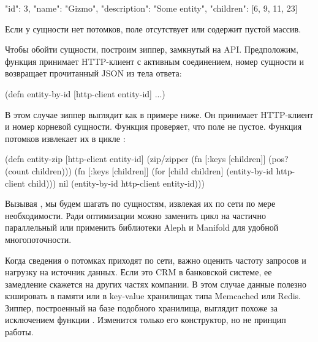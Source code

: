 \begin{english}
  \begin{json}
{
  "id": 3,
  "name": "Gizmo",
  "description": "Some entity",
  "children": [6, 9, 11, 23]
}
  \end{json}
\end{english}

Если у сущности нет потомков, поле  отсутствует или содержит
пустой массив.

Чтобы обойти сущности, построим зиппер, замкнутый на API. Предположим, функция
 принимает HTTP-клиент с активным соединением, номер сущности
и возвращает прочитанный JSON из тела ответа:

\begin{english}
  \begin{clojure}
(defn entity-by-id
  [http-client entity-id]
  ...)
  \end{clojure}
\end{english}

В этом случае зиппер выглядит как в примере ниже. Он принимает HTTP-клиент и
номер корневой сущности. Функция  проверяет, что поле  не
пустое. Функция потомков извлекает их в цикле :

\begin{english}
  \begin{clojure}
(defn entity-zip
  [http-client entity-id]
  (zip/zipper
    (fn [{:keys [children]}]
      (pos? (count children)))
    (fn [{:keys [children]}]
      (for [child children]
        (entity-by-id http-client child)))
    nil
    (entity-by-id http-client entity-id)))
  \end{clojure}
\end{english}

Вызывая , мы будем шагать по сущностям, извлекая их по сети по мере
необходимости. Ради оптимизации можно заменить цикл  на частично
параллельный  или применить библиотеки Aleph и Manifold для удобной
многопоточности.


Когда сведения о потомках приходят по сети, важно оценить частоту запросов и
нагрузку на источник данных. Если это CRM в банковской системе, ее замедление
скажется на других частях компании. В этом случае данные полезно кэшировать в
памяти или в key-value хранилищах типа Memcached или Redis. Зиппер, построенный
на базе подобного хранилища, выглядит похоже за исключением функции
. Изменится только его конструктор, но не принцип работы.

